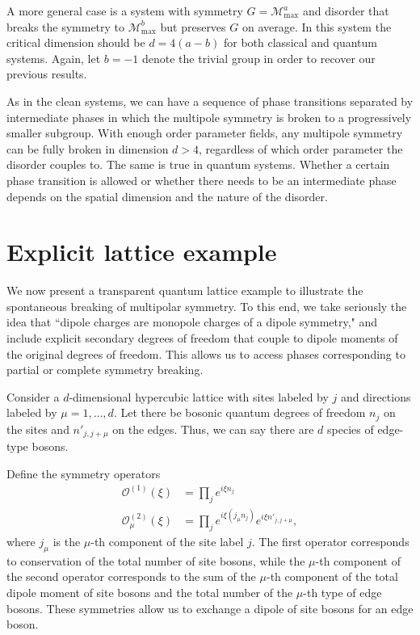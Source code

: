 \documentclass[twocolumn, longbibliography]{revtex4-2}
\newcommand{\op}[1]{\mathcal{O}^{(#1)}}
\newcommand{\nn}{\nonumber\\}
\renewcommand{\max}{\text{max}}
\begin{document}
A more general case is a system with symmetry $G = \mathcal{M}_\max^a$ and disorder that breaks the symmetry to $\mathcal{M}_\max^b$ but preserves $G$ on average. In this system the critical dimension should be $d=4(a-b)$ for both classical and quantum systems. Again, let $b=-1$ denote the trivial group in order to recover our previous results.

As in the clean systems, we can have a sequence of phase transitions separated by intermediate phases in which the multipole symmetry is broken to a progressively smaller subgroup. With enough order parameter fields, any multipole symmetry can be fully broken in dimension $d>4$, regardless of which order parameter the disorder couples to. The same is true in quantum systems. Whether a certain phase transition is allowed or whether there needs to be an intermediate phase depends on the spatial dimension and the nature of the disorder.

\section{Explicit lattice example} \label{sec:example}

We now present a transparent quantum lattice example to illustrate the spontaneous breaking of multipolar symmetry. To this end, we take seriously the idea that ``dipole charges are monopole charges of a dipole symmetry," and include explicit secondary degrees of freedom that couple to dipole moments of the original degrees of freedom. This allows us to access phases corresponding to partial or complete symmetry breaking. 

Consider a $d$-dimensional hypercubic lattice with sites labeled by $j$ and directions labeled by $\mu = 1,\dots,d$. Let there be bosonic quantum degrees of freedom $n_j$ on the sites and $n'_{j,j+\mu}$ on the edges. Thus, we can say there are $d$ species of edge-type bosons.

Define the symmetry operators
\begin{align}
\op{1}(\xi) &= \prod_je^{i\xi n_j}\nn
\op{2}_\mu(\xi) &= \prod_j e^{i\xi (j_\mu n_j)}e^{i\xi n'_{j,j+\mu}},
\end{align}
where $j_\mu$ is the $\mu$-th component of the site label $j$.
The first operator corresponds to conservation of the total number of site bosons, while the $\mu$-th component of the second operator corresponds to the sum of the $\mu$-th component of the total dipole moment of site bosons and the total number of the $\mu$-th type of edge bosons. These symmetries allow us to exchange a dipole of site bosons for an edge boson. 
\end{document}
